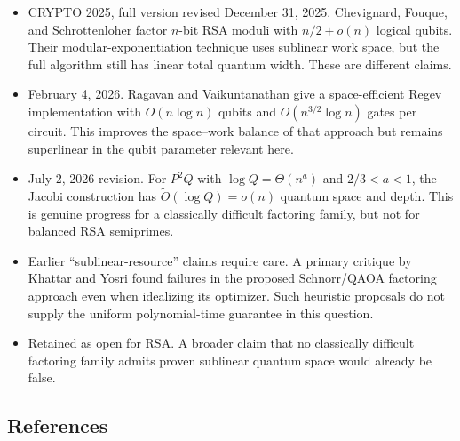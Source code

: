 \begin{itemize}
  \item CRYPTO 2025, full version revised December 31, 2025. Chevignard, Fouque, and Schrottenloher factor $n$-bit RSA moduli with $n/2+o(n)$ logical qubits. Their modular-exponentiation technique uses sublinear work space, but the full algorithm still has linear total quantum width. These are different claims. 

  \item February 4, 2026. Ragavan and Vaikuntanathan give a space-efficient Regev implementation with $O(n\log n)$ qubits and $O(n^{3/2}\log n)$ gates per circuit. This improves the space–work balance of that approach but remains superlinear in the qubit parameter relevant here. 

  \item July 2, 2026 revision. For $P^2Q$ with $\log Q=\Theta(n^a)$ and $2/3<a<1$, the Jacobi construction has $\widetilde O(\log Q)=o(n)$ quantum space and depth. This is genuine progress for a classically difficult factoring family, but not for balanced RSA semiprimes. 

  \item Earlier “sublinear-resource” claims require care. A primary critique by Khattar and Yosri found failures in the proposed Schnorr/QAOA factoring approach even when idealizing its optimizer. Such heuristic proposals do not supply the uniform polynomial-time guarantee in this question. 

  \item Retained as open for RSA. A broader claim that no classically difficult factoring family admits proven sublinear quantum space would already be false.
\end{itemize}

\subsection*{References}

